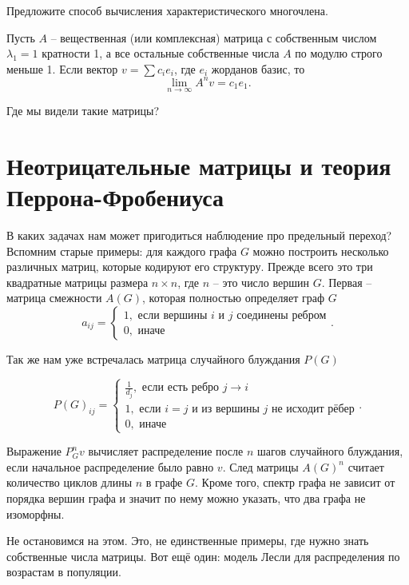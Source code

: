 \upr Предложите способ вычисления характеристического многочлена. 
\eupr


\utv Пусть $A$ -- вещественная (или комплексная) матрица с собственным числом $\lambda_1=1$ кратности 1, а все остальные собственные числа $A$ по модулю строго меньше 1. Если вектор $v= \sum c_i e_i$, где $e_i$ жорданов базис, то $$\lim_{n \to \infty}A^nv= c_1 e_1.$$
\eutv

Где мы видели такие матрицы?


\section{Неотрицательные матрицы и теория Перрона-Фробениуса}
\dfn

В каких задачах нам может пригодиться наблюдение про предельный переход? Вспомним старые примеры: для каждого графа $G$ можно построить  несколько  различных матриц, которые кодируют его структуру. Прежде всего это три квадратные матрицы  размера $n\times n$, где $n$ -- это число вершин $G$. 
Первая -- матрица смежности  $A(G)$, которая полностью определяет граф $G$
$$a_{ij}=\begin{cases} 1, \text{ если вершины $i$ и $j$ соединены ребром}\\
0, \text{ иначе }
\end{cases}.$$

Так же нам уже встречалась матрица случайного блуждания  $P(G)$

$$P(G)_{ij}=\begin{cases}
\frac{1}{d_j}, \text{ если есть ребро $j\to i$}\\
1, \text{ если $i=j$ и из вершины $j$ не исходит рёбер} \\
0, \text{ иначе }
\end{cases}.$$
\edfn

Выражение  $P_G^n v$ вычисляет распределение после $n$ шагов случайного блуждания, если начальное распределение было равно $v$. След матрицы $A(G)^n$ считает количество циклов длины $n$ в графе $G$. Кроме того, спектр графа не зависит от порядка вершин графа и значит по нему можно указать, что два графа не изоморфны.

Не остановимся на этом. Это, не единственные примеры, где нужно знать собственные числа матрицы. Вот ещё один: модель Лесли для распределения по возрастам в популяции.

